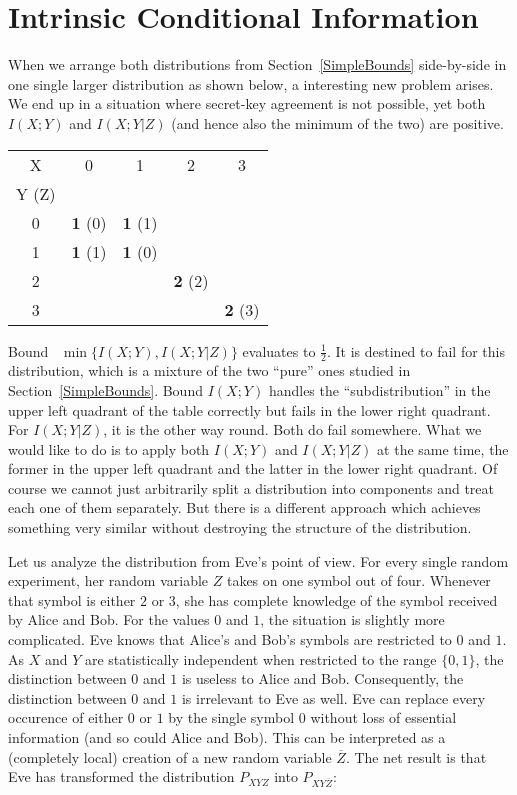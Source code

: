 \documentclass[a4paper, twoside, openany]{report}
\newcommand{\p}[1]{\textbf{#1}}
\newcommand{\half}{\frac{1}{2}}
\newcommand{\ol}[1]{\overline{#1}}
\newcommand{\zol}{\ol{Z}}
\theoremstyle{plain}
\theoremstyle{definition}
\begin{document}
\section{Intrinsic Conditional Information} \label{ch:intri}

When we arrange both distributions from Section~\ref{SimpleBounds} side-by-side in one single larger distribution as shown below, a interesting new problem arises. We end up in a situation where secret-key agreement is not possible, yet both $I(X;Y)$ and $I(X;Y|Z)$ (and hence also the minimum of the two) are positive. 

\begin{center}
\begin{tabular}{|c||c|c|c|c|}
\hline
X     &     0     &     1     &     2     &     3     \\
Y (Z) &           &           &           &           \\
\hline\hline
0     & \p{1} (0) & \p{1} (1) &           &           \\
\hline
1     & \p{1} (1) & \p{1} (0) &           &           \\
\hline
2     &           &           & \p{2} (2) &           \\
\hline
3     &           &           &           & \p{2} (3) \\
\hline
\end{tabular}
\end{center}

Bound \ $\min \{I(X;Y), I(X;Y|Z)\}$ evaluates to $\half$. It is destined to fail for this distribution, which is a mixture of the two ``pure'' ones studied in Section~\ref{SimpleBounds}. Bound $I(X;Y)$ handles the ``subdistribution'' in the upper left quadrant of the table correctly but fails in the lower right quadrant. For $I(X;Y|Z)$, it is the other way round. Both do fail somewhere. What we would like to do is to apply both $I(X;Y)$ and $I(X;Y|Z)$ at the same time, the former in the upper left quadrant and the latter in the lower right quadrant. Of course we cannot just arbitrarily split a distribution into components and treat each one of them separately. But there is a different approach which achieves something very similar without destroying the structure of the distribution.

Let us analyze the distribution from Eve's point of view. For every single random experiment, her random variable $Z$ takes on one symbol out of four. Whenever that symbol is either $2$ or $3$, she has complete knowledge of the symbol received by Alice and Bob. For the values $0$ and $1$, the situation is slightly more complicated. Eve knows that Alice's and Bob's symbols are restricted to $0$ and $1$. As $X$ and $Y$ are statistically independent when restricted to the range $\{0, 1\}$, the distinction between $0$ and $1$ is useless to Alice and Bob. Consequently, the distinction between $0$ and $1$ is irrelevant to Eve as well. Eve can replace every occurence of either $0$ or $1$ by the single symbol $0$ without loss of essential information (and so could Alice and Bob). This can be interpreted as a (completely local) creation of a new random variable $\zol$. The net result is that Eve has transformed the distribution $P_{XYZ}$ into $P_{XY\zol}$:~
\end{document}
